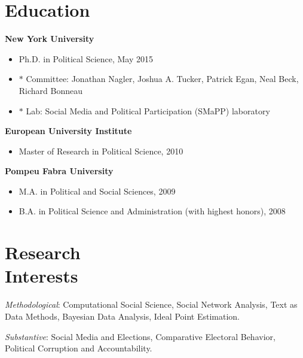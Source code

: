 \documentclass[margin,line,11pt]{resume}
\begin{document}
\begin{resume}
    \section{\mysidestyle Education}
\textbf{New York University}
\begin{itemize}
\item[] Ph.D. in Political Science, May 2015
\vspace{-.15cm}
\item[] $\ast$ Committee: Jonathan Nagler, Joshua A. Tucker, Patrick Egan, Neal Beck, Richard Bonneau
\vspace{-.15cm}
\item[] $\ast$  Lab: Social Media and Political Participation (SMaPP) laboratory
\end{itemize}
\vspace{-.30cm}
\textbf{European University Institute} 
\begin{itemize}
\item[] Master of Research in Political Science, 2010
\end{itemize}
\vspace{-.30cm}
\textbf{Pompeu Fabra University} 
\begin{itemize}
\item[] M.A. in Political and Social Sciences, 2009
\vspace{-.15cm}
\item[] B.A. in Political Science and Administration (with highest honors), 2008 
\end{itemize}

    \section{\mysidestyle Research\\Interests}
\emph{Methodological}: Computational Social Science, Social Network Analysis, Text as Data Methods,  Bayesian Data Analysis, Ideal Point Estimation.
\vspace{-.30cm}

\emph{Substantive}: Social Media and Elections, Comparative Electoral Behavior, Political Corruption and Accountability.
    
    

\end{resume}
\end{document}
